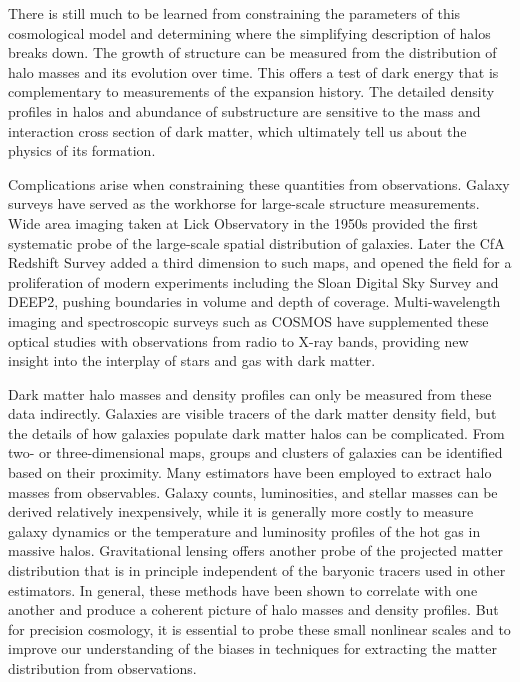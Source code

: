 There is still much to be learned from constraining the parameters of
this cosmological model and determining where the simplifying
description of halos breaks down. The growth of structure can be
measured from the distribution of halo masses and its evolution over
time. This offers a test of dark energy that is complementary to
measurements of the expansion history.  The detailed density profiles
in halos and abundance of substructure are sensitive to the mass and
interaction cross section of dark matter, which ultimately tell us
about the physics of its formation.

Complications arise when constraining these quantities from
observations. Galaxy surveys have served as the workhorse for
large-scale structure measurements. Wide area imaging taken at Lick
Observatory in the 1950s provided the first systematic probe of the
large-scale spatial distribution of galaxies. Later the CfA Redshift
Survey added a third dimension to such maps, and opened the field for
a proliferation of modern experiments including the Sloan Digital Sky
Survey and DEEP2, pushing boundaries in volume and depth of
coverage. Multi-wavelength imaging and spectroscopic surveys such as
COSMOS have supplemented these optical studies with observations
from radio to X-ray bands, providing new insight into the interplay of
stars and gas with dark matter.

Dark matter halo masses and density profiles can only be measured from
these data indirectly. Galaxies are visible tracers of the dark matter
density field, but the details of how galaxies populate dark matter
halos can be complicated. From two- or three-dimensional maps, groups
and clusters of galaxies can be identified based on their
proximity. Many estimators have been employed to extract halo masses
from observables. Galaxy counts, luminosities, and stellar masses can
be derived relatively inexpensively, while it is generally more costly
to measure galaxy dynamics or the temperature and luminosity profiles
of the hot gas in massive halos. Gravitational lensing offers another
probe of the projected matter distribution that is in principle
independent of the baryonic tracers used in other estimators. In
general, these methods have been shown to correlate with one another
and produce a coherent picture of halo masses and density profiles.
But for precision cosmology, it is essential to probe these small
nonlinear scales and to improve our understanding of the biases in
techniques for extracting the matter distribution from observations.

